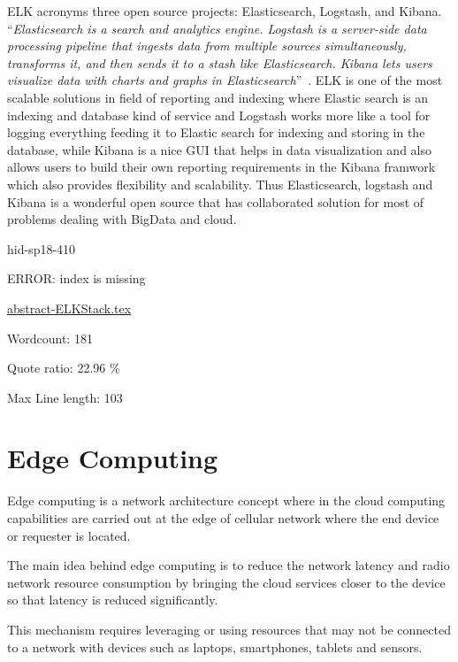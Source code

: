 ELK acronyms three open source projects: Elasticsearch, Logstash, 
and Kibana. \color{blue}``\emph{Elasticsearch is a search and analytics engine. Logstash is a 
server-side data processing pipeline that ingests data from multiple sources 
simultaneously, transforms it, and then sends it to a stash like 
Elasticsearch. Kibana lets users visualize data with charts and graphs in 
Elasticsearch}''\color{black}~\cite{hid-sp18-410-ELKBlog}. ELK is one of the most scalable solutions in
field of reporting and indexing where Elastic search is an indexing and
database kind of service and Logstash works more like a tool for logging
everything feeding it to Elastic search for indexing and storing in 
the database, while Kibana is a nice GUI that helps in data visualization
and also allows users to build their own reporting requirements in the
Kibana framwork which also provides flexibility and scalability.
Thus Elasticsearch, logstash and Kibana is a wonderful open source that
has collaborated solution for most of problems dealing with BigData 
and cloud.



\begin{IU}

hid-sp18-410

ERROR: index is missing

\href{https://github.com/cloudmesh-community/hid-sp18-410/blob/master//technology/abstract-ELKStack.tex}{abstract-ELKStack.tex}

 

Wordcount: 181


Quote ratio: 22.96 \%
 
Max Line length: 103
\end{IU}

\section{Edge Computing}

Edge computing is a network architecture concept where in the cloud 
computing capabilities are carried out at the edge of cellular network
where the end device or requester is located.

The main idea behind edge computing is to reduce the network latency and
radio network resource consumption by bringing the cloud services closer
to the device so that latency is reduced significantly.

This mechanism requires leveraging or using resources that may not be 
connected to a network with devices such as laptops, smartphones, 
tablets and sensors.


